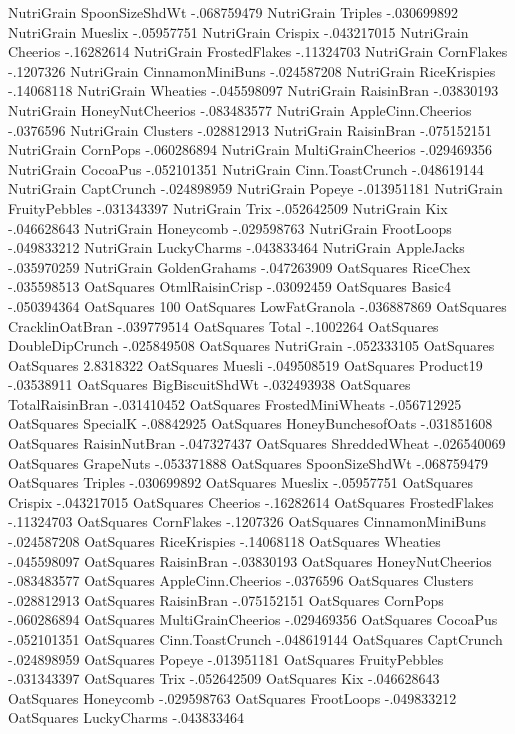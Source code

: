 NutriGrain	SpoonSizeShdWt	-.068759479
NutriGrain	Triples	-.030699892
NutriGrain	Mueslix	-.05957751
NutriGrain	Crispix	-.043217015
NutriGrain	Cheerios	-.16282614
NutriGrain	FrostedFlakes	-.11324703
NutriGrain	CornFlakes	-.1207326
NutriGrain	CinnamonMiniBuns	-.024587208
NutriGrain	RiceKrispies	-.14068118
NutriGrain	Wheaties	-.045598097
NutriGrain	RaisinBran	-.03830193
NutriGrain	HoneyNutCheerios	-.083483577
NutriGrain	AppleCinn.Cheerios	-.0376596
NutriGrain	Clusters	-.028812913
NutriGrain	RaisinBran	-.075152151
NutriGrain	CornPops	-.060286894
NutriGrain	MultiGrainCheerios	-.029469356
NutriGrain	CocoaPus	-.052101351
NutriGrain	Cinn.ToastCrunch	-.048619144
NutriGrain	CaptCrunch	-.024898959
NutriGrain	Popeye	-.013951181
NutriGrain	FruityPebbles	-.031343397
NutriGrain	Trix	-.052642509
NutriGrain	Kix	-.046628643
NutriGrain	Honeycomb	-.029598763
NutriGrain	FrootLoops	-.049833212
NutriGrain	LuckyCharms	-.043833464
NutriGrain	AppleJacks	-.035970259
NutriGrain	GoldenGrahams	-.047263909
OatSquares	RiceChex	-.035598513
OatSquares	OtmlRaisinCrisp	-.03092459
OatSquares	Basic4	-.050394364
OatSquares	100%
OatSquares	LowFatGranola	-.036887869
OatSquares	CracklinOatBran	-.039779514
OatSquares	Total	-.1002264
OatSquares	DoubleDipCrunch	-.025849508
OatSquares	NutriGrain	-.052333105
OatSquares	OatSquares	2.8318322
OatSquares	Muesli	-.049508519
OatSquares	Product19	-.03538911
OatSquares	BigBiscuitShdWt	-.032493938
OatSquares	TotalRaisinBran	-.031410452
OatSquares	FrostedMiniWheats	-.056712925
OatSquares	SpecialK	-.08842925
OatSquares	HoneyBunchesofOats	-.031851608
OatSquares	RaisinNutBran	-.047327437
OatSquares	ShreddedWheat	-.026540069
OatSquares	GrapeNuts	-.053371888
OatSquares	SpoonSizeShdWt	-.068759479
OatSquares	Triples	-.030699892
OatSquares	Mueslix	-.05957751
OatSquares	Crispix	-.043217015
OatSquares	Cheerios	-.16282614
OatSquares	FrostedFlakes	-.11324703
OatSquares	CornFlakes	-.1207326
OatSquares	CinnamonMiniBuns	-.024587208
OatSquares	RiceKrispies	-.14068118
OatSquares	Wheaties	-.045598097
OatSquares	RaisinBran	-.03830193
OatSquares	HoneyNutCheerios	-.083483577
OatSquares	AppleCinn.Cheerios	-.0376596
OatSquares	Clusters	-.028812913
OatSquares	RaisinBran	-.075152151
OatSquares	CornPops	-.060286894
OatSquares	MultiGrainCheerios	-.029469356
OatSquares	CocoaPus	-.052101351
OatSquares	Cinn.ToastCrunch	-.048619144
OatSquares	CaptCrunch	-.024898959
OatSquares	Popeye	-.013951181
OatSquares	FruityPebbles	-.031343397
OatSquares	Trix	-.052642509
OatSquares	Kix	-.046628643
OatSquares	Honeycomb	-.029598763
OatSquares	FrootLoops	-.049833212
OatSquares	LuckyCharms	-.043833464
